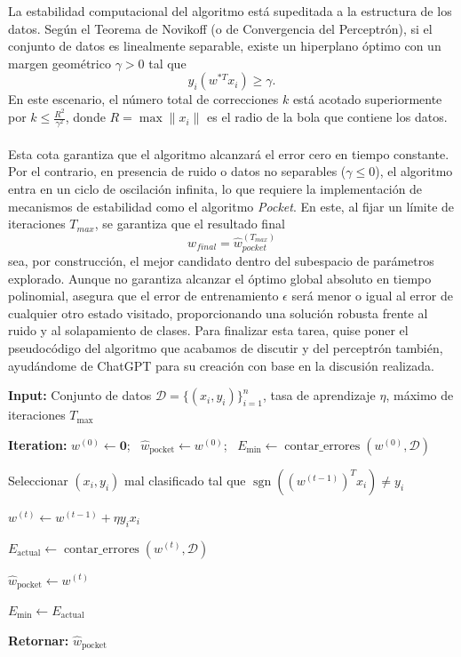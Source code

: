 \documentclass{article}
\begin{document}
La estabilidad computacional del algoritmo está supeditada a la estructura de los datos. Según el Teorema de Novikoff (o de Convergencia del Perceptrón), si el conjunto de datos es linealmente separable, existe un hiperplano óptimo con un margen geométrico $\gamma > 0$ tal que \[y_i (w^{*T} x_i) \geq \gamma.\] En este escenario, el número total de correcciones $k$ está acotado superiormente por $k \leq \frac{R^2}{\gamma^2}$, donde $R = \max \|x_i\|$ es el radio de la bola que contiene los datos. \\ \\Esta cota garantiza que el algoritmo alcanzará el error cero en tiempo constante. Por el contrario, en presencia de ruido o datos no separables ($\gamma \leq 0$), el algoritmo entra en un ciclo de oscilación infinita, lo que requiere la implementación de mecanismos de estabilidad como el algoritmo \textit{Pocket}. En este, al fijar un límite de iteraciones $T_{max}$, se garantiza que el resultado final \[w_{final} = \hat{w}_{pocket}^{(T_{max})}\] sea, por construcción, el mejor candidato dentro del subespacio de parámetros explorado. Aunque no garantiza alcanzar el óptimo global absoluto en tiempo polinomial, asegura que el error de entrenamiento $\epsilon$ será menor o igual al error de cualquier otro estado visitado, proporcionando una solución robusta frente al ruido y al solapamiento de clases. Para finalizar esta tarea, quise poner el pseudocódigo del algoritmo que acabamos de discutir y del perceptrón también, ayudándome de ChatGPT para su creación con base en la discusión realizada.

\begin{algorithm}
\caption{Algoritmo Pocket (Variante Estable del Perceptrón)}
\begin{algorithmic}[1]

\State \textbf{Input:} Conjunto de datos
$\mathcal{D}=\{(x_i,y_i)\}_{i=1}^{n}$,
tasa de aprendizaje $\eta$,
máximo de iteraciones $T_{\max}$

\State \textbf{Iteration:}
$w^{(0)}\gets\mathbf{0}$; \
$\hat{w}_{\text{pocket}}\gets w^{(0)}$; \
$E_{\min}\gets \operatorname{contar\_errores}(w^{(0)},\mathcal{D})$

\For{$t=1$ \textbf{to} $T_{\max}$}

    \State Seleccionar $(x_i,y_i)$ mal clasificado tal que
    $\operatorname{sgn}\!\left((w^{(t-1)})^{T}x_i\right)\neq y_i$

    \State
    $w^{(t)}\gets
    w^{(t-1)}+\eta y_i x_i$

    \State
    $E_{\text{actual}}\gets
    \operatorname{contar\_errores}(w^{(t)},\mathcal{D})$

        \State
        $\hat{w}_{\text{pocket}}\gets w^{(t)}$

        \State
        $E_{\min}\gets E_{\text{actual}}$

    \EndIf

\EndFor

\State \textbf{Retornar:} $\hat{w}_{\text{pocket}}$

\end{algorithmic}
\end{algorithm}
\end{document}
